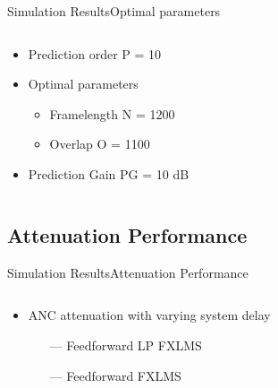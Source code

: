 \begin{frame}{Simulation Results}{Optimal parameters}		
\begin{columns}
	\begin{column}{0.4\textwidth}
	\begin{itemize}
		\item Prediction order P = 10
		\item Optimal parameters
		\begin{itemize}
			\item Framelength N = 1200
			\item Overlap O = 1100
		\end{itemize}
		\item Prediction Gain PG = 10 dB
	\end{itemize}
	\end{column}
	\begin{column}{0.6\textwidth} 
		\resizebox{0.9\columnwidth}{!}{		
			}
	\end{column}
\end{columns}
\end{frame}






\subsection{Attenuation Performance}
\begin{frame}{Simulation Results}{Attenuation Performance}		
\begin{columns}
	\begin{column}{0.4\textwidth}
	\begin{itemize}
		\item ANC attenuation with varying system delay
		\begin{itemize}
				\item[\textcolor{MATLABorange}{---}] Feedforward LP FXLMS 
				\item[\textcolor{MATLABblue}{---}] Feedforward FXLMS 
		\end{itemize}
	\end{itemize}
	\end{column}
	\begin{column}{0.6\textwidth} 
		\resizebox{0.9\columnwidth}{!}{		
			}
	\end{column}
\end{columns}
\end{frame}






